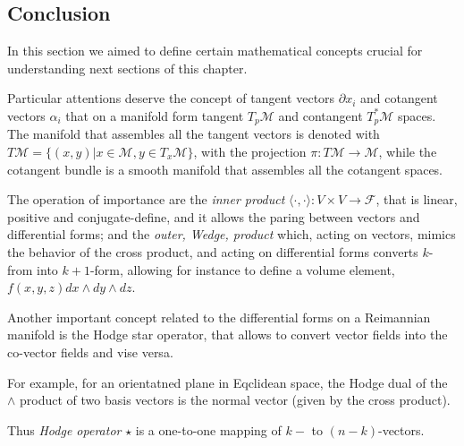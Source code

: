 
\subsection{Conclusion}

In this section we aimed to define certain mathematical concepts crucial for understanding next sections of this chapter.

Particular attentions deserve the concept of tangent vectors $\partial x_i$ and cotangent vectors $\alpha_i$ that on a manifold form tangent $T_p \mathcal{M}$ and contangent $T_p^*\mathcal{M}$ spaces. The manifold that assembles all the tangent vectors is denoted with $T\mathcal{M} = \{ (x,y) | x\in \mathcal{M}, y \in T_x \mathcal{M} \}$, with the projection $\pi:T\mathcal{M}\rightarrow \mathcal{M}$, while the cotangent bundle is a smooth manifold that assembles all the cotangent spaces.

The operation of importance are the \textit{inner product} $\langle \cdot,\cdot \rangle : V \times V \rightarrow \mathcal{F}$, that is linear, positive and conjugate-define, and it allows the paring between vectors and differential forms; 
and the \textit{outer, Wedge, product} which, acting on vectors, mimics the behavior of the cross product, and acting on differential forms converts $k$-from into $k+1$-form, allowing for instance to define a volume element, $f(x,y,z)dx \wedge dy \wedge dz$. 

Another important concept related to the differential forms on a Reimannian manifold is the Hodge star operator, that allows to convert vector fields into the co-vector fields and vise versa.

For example, for an orientatned plane in Eqclidean space,
the Hodge dual of the $\wedge$ product of two basis vectors is the normal vector (given by the cross product).

Thus \textit{Hodge operator} $\star$ is a one-to-one mapping of $k-$ to $(n-k)$-vectors.

